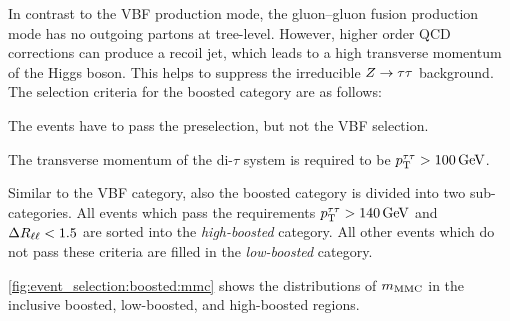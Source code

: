 In contrast to the VBF production mode, the gluon--gluon fusion production mode has no outgoing partons at tree-level.
However, higher order QCD corrections can produce a recoil jet, which leads to a high transverse momentum of the Higgs boson.
This helps to suppress the irreducible $Z \to \tau \tau$ background.
The selection criteria for the boosted category are as follows:
\begin{description}[style=nextline,leftmargin=1cm]
    \item[(1B) Veto on VBF selection]
        The events have to pass the preselection, but not the VBF selection.
    \item[(2B) Higgs boson transverse momentum]
        The transverse momentum of the di-$\tau$ system is required to be $\pt^{\tau\tau} > \SI{100}{\GeV}$.
\end{description}
Similar to the VBF category, also the boosted category is divided into two sub-categories.
All events which pass the requirements $\pt^{\tau\tau} > \SI{140}{\GeV}$ and $\Delta R_{\ell\ell} < 1.5$ are sorted
into the \emph{high-boosted} category. All other events which do not pass these criteria are filled in the
\emph{low-boosted} category.

\cref{fig:event_selection:boosted:mmc} shows the distributions of $m_\text{MMC}$ in the inclusive boosted, low-boosted, and high-boosted regions.

